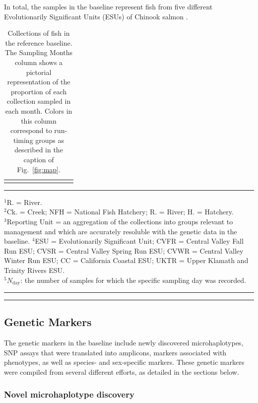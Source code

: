 In total, the samples in the baseline represent fish from five different Evolutionarily Significant
Units (ESUs) of Chinook salmon \citep{waples1991pacific}.
\begin{table}
\caption{\footnotesize Collections of fish in the reference baseline.  The Sampling Months column shows
a pictorial representation of the proportion of each collection sampled in each month.  Colors in
this column correspond to run-timing groups as described in the caption of Fig.~\protect\ref{fig:map}.}
\label{tab:samples}
{\small
\begin{tabular*}{\linewidth}{@{\extracolsep{\fill}} lllllllrcr}
\vspace*{0.4ex}

\end{tabular*}
}
\rule{3cm}{0.3pt}

{\scriptsize
$^1$R. = River.\\
$^2$Ck. = Creek; NFH = National Fish Hatchery; R. = River; H. = Hatchery.\\
$^3$Reporting Unit = an aggregation of the collections into groups relevant to management and
which are accurately resoluble with the genetic data in the baseline.
$^4$ESU = Evolutionarily Significant Unit; CVFR = Central Valley Fall Run ESU; CVSR = Central Valley Spring Run ESU; CVWR =
Central Valley Winter Run ESU; CC = California Coastal ESU; UKTR = Upper Klamath and Trinity Rivers ESU. \\
$^5N_\mathrm{day}$: the number of samples for which the specific sampling day was recorded.
}
\hrule\vspace*{0.3ex}\hrule
\end{table}

\subsection*{Genetic Markers}

The genetic markers in the baseline include newly discovered microhaplotypes, SNP assays
that were translated into amplicons, markers associated with phenotypes, as well
as species- and sex-specific markers.
These genetic markers were compiled from several different
efforts, as detailed in the sections below.

\subsubsection*{Novel microhaplotype discovery}

